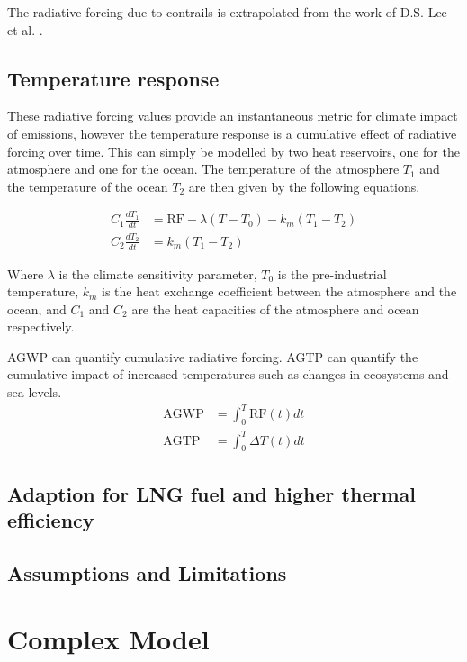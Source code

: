 \documentclass{article}
\begin{document}
The radiative forcing due to contrails is extrapolated from the work of D.S. Lee et al. \cite{contrail_radiative_forcing}.

\subsection{Temperature response}

These radiative forcing values provide an instantaneous metric for climate impact of emissions, however
the temperature response is a cumulative effect of radiative forcing over time.
This can simply be modelled by two heat reservoirs, one for the atmosphere and one for the ocean.
The temperature of the atmosphere $T_1$ and the temperature of the ocean $T_2$ are then given by the following equations.

\begin{align}
    C_1 \frac{dT_1}{dt} &= \text{RF} - \lambda(T - T_0) - k_m(T_1 - T_2) \\
    C_2 \frac{dT_2}{dt} &= k_m(T_1 - T_2)
\end{align}

Where $\lambda$ is the climate sensitivity parameter, $T_0$ is the pre-industrial temperature, $k_m$ is the heat exchange coefficient between the atmosphere and the ocean, and $C_1$ and $C_2$ are the heat capacities of the atmosphere and ocean respectively.

AGWP can quantify cumulative radiative forcing.
AGTP can quantify the cumulative impact of increased temperatures such as changes in ecosystems and sea levels.
\begin{align}
    \text{AGWP} &= \int_0^T \text{RF}(t) dt \\
    \text{AGTP} &= \int_0^T \Delta T(t) dt
\end{align}

\subsection{Adaption for LNG fuel and higher thermal efficiency}

\subsection{Assumptions and Limitations}



\section{Complex Model}
\end{document}
